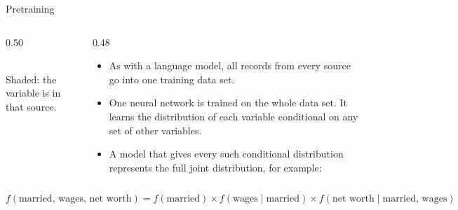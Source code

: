 \documentclass[11pt,aspectratio=169]{beamer}
\begin{document}
\begin{frame}{Pretraining}
  \begin{columns}[c]
    \begin{column}{0.50\textwidth}
      \centering
      \\[0.3em]
      {\scriptsize Shaded: the variable is in that source.}
    \end{column}
    \begin{column}{0.48\textwidth}
      \small
      \begin{itemize}
        \item As with a language model, all records from every source go into one training data set.
        \vspace{0.3em}
        \item One neural network is trained on the whole data set. It learns the distribution of each
              variable conditional on any set of other variables.
        \vspace{0.3em}
        \item A model that gives every such conditional distribution represents the full joint
              distribution, for example:
      \end{itemize}
    \end{column}
  \end{columns}
  \vspace{0.4em}
  {\small
  \[
    f(\text{married},\, \text{wages},\, \text{net worth})
    = f(\text{married}) \times f(\text{wages} \mid \text{married})
      \times f(\text{net worth} \mid \text{married, wages})
  \]}
\end{frame}
\end{document}
